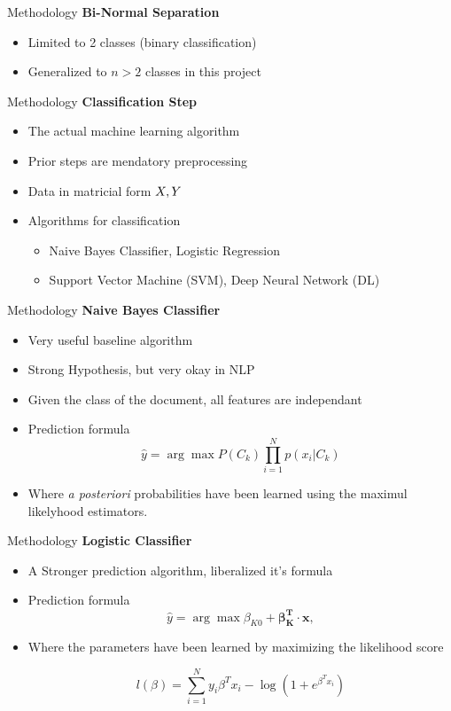 \begin{frame}[label=metho]{Methodology}
	\textbf{Bi-Normal Separation}
	\begin{itemize}
		\item Limited to 2 classes (binary classification)
		\item Generalized to $n>2$ classes in this project
	\end{itemize}
\end{frame}


\begin{frame}[label=metho]{Methodology}
	\textbf{Classification Step}
	\begin{itemize}
		\item The actual machine learning algorithm
		\item Prior steps are mendatory preprocessing
		\item Data in matricial form $\boldmath{X}, \boldmath{Y}$ 
		\item Algorithms for classification
		\begin{itemize}
			\item Naive Bayes Classifier, Logistic Regression
			\item Support Vector Machine (SVM), Deep Neural Network (DL)
		\end{itemize}
	\end{itemize}
\end{frame}


\begin{frame}[label=metho]{Methodology}
	\textbf{Naive Bayes Classifier}
	\begin{itemize}
		\item Very useful baseline algorithm
		\item Strong Hypothesis, but very okay in NLP
		\item Given the class of the document, all features are independant
		\item Prediction formula
		$$\hat{y} = \arg\max P(C_k) \prod_{i=1}^{N}p(x_i|C_k)$$
		\item Where \textit{a posteriori} probabilities have been learned using the maximul likelyhood estimators.
		
	\end{itemize}
	
	
	
\end{frame}




\begin{frame}[label=metho]{Methodology}
	\textbf{Logistic Classifier}
	\begin{itemize}
		\item A Stronger prediction algorithm, liberalized it's formula
		\item Prediction formula
$$ \hat{y} = \arg\max \beta_{K0} + \boldsymbol{\beta_{K}^T} \cdot  \boldsymbol{x} , $$
		\item Where the parameters have been learned by maximizing the likelihood score

	$$  l(\beta) = \sum_{i=1}^{N} y_i \beta^T x_i - \log(1+ e^{\beta^T x_i}) $$
		
	\end{itemize}
\end{frame}

